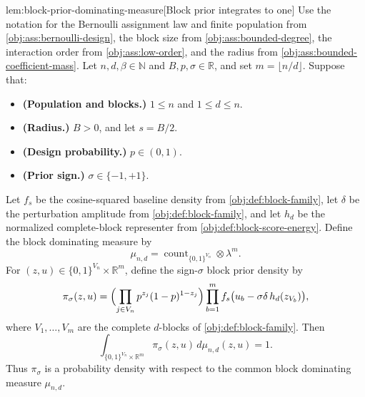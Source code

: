 \documentclass[11pt]{article}
\begin{document}
\begin{lemmav}{lem:block-prior-dominating-measure}[Block prior integrates to one]
Use the notation for the Bernoulli assignment law and finite population from \cref{obj:ass:bernoulli-design}, the block size from \cref{obj:ass:bounded-degree}, the interaction order from \cref{obj:ass:low-order}, and the radius from \cref{obj:ass:bounded-coefficient-mass}. Let \(n,d,\beta\in\mathbb N\) and \(B,p,\sigma\in\mathbb R\), and set \(m=\lfloor n/d\rfloor\). Suppose that:
\begin{itemize}
\item \textbf{(Population and blocks.)} \(1\le n\) and \(1\le d\le n\).
\item \textbf{(Radius.)} \(B>0\), and let \(s=B/2\).
\item \textbf{(Design probability.)} \(p\in(0,1)\).
\item \textbf{(Prior sign.)} \(\sigma\in\{-1,+1\}\).
\end{itemize}
Let \(f_s\) be the cosine-squared baseline density from \cref{obj:def:block-family}, let \(\delta\) be the perturbation amplitude from \cref{obj:def:block-family}, and let \(h_d\) be the normalized complete-block representer from \cref{obj:def:block-score-energy}. Define the block dominating measure by
\[
\mu_{n,d}
=
\operatorname{count}_{\{0,1\}^{V_n}}\otimes \lambda^m .
\]
For \((z,u)\in\{0,1\}^{V_n}\times\mathbb R^m\), define the sign-\(\sigma\) block prior density by
\[
\pi_\sigma(z,u)
=
\Bigl(\prod_{j\in V_n} p^{z_j}(1-p)^{1-z_j}\Bigr)
\prod_{b=1}^{m}
f_s\bigl(u_b-\sigma\delta\,h_d(z_{V_b})\bigr),
\]
where \(V_1,\ldots,V_m\) are the complete \(d\)-blocks of \cref{obj:def:block-family}. Then
\[
\int_{\{0,1\}^{V_n}\times\mathbb R^m}\pi_\sigma(z,u)\,d\mu_{n,d}(z,u)=1.
\]
Thus \(\pi_\sigma\) is a probability density with respect to the common block dominating measure \(\mu_{n,d}\).
\end{lemmav}
\end{document}
